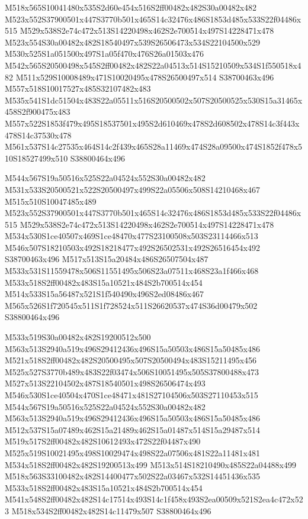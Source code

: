 \documentclass{article}
\begin{document}
\begin{multicols}{2}
M518x565S10041480x535S2d60e454x516S2ff00482x482S30a00482x482 M523x552S37900501x447S3770b501x465S14c32476x486S1853d485x533S22f04486x515 M529x538S2e74c472x513S14220498x462S2e700514x497S14228471x478 M523x554S30a00482x482S18540497x539S26506473x534S22104500x529 M530x525S1a051500x497S1a05f470x476S26a01503x476 M542x565S20500498x545S2ff00482x482S22a04513x514S15210509x534S1f550518x482 M511x529S10008489x471S10020495x478S26500497x514 S38700463x496 M557x518S10017527x485S32107482x483 M535x541S1dc51504x483S22a05511x516S20500502x507S20500525x530S15a31465x458S2f900475x483 M557x522S1853f479x495S18537501x495S2d610469x478S2d608502x478S14c3f443x478S14c37530x478 M561x537S14c27535x464S14c2f439x465S28a11469x474S28a09500x474S1852f478x510S18527499x510 S38800464x496

M544x567S19a50516x525S22a04524x552S30a00482x482 M531x533S20500521x522S20500497x499S22a05506x508S14210468x467 M515x510S10047485x489 M523x552S37900501x447S3770b501x465S14c32476x486S1853d485x533S22f04486x515 M529x538S2e74c472x513S14220498x462S2e700514x497S14228471x478 M534x530S1ce40507x469S1ce48470x477S23100508x503S23114466x513 M546x507S18210503x492S18218477x492S26502531x492S26516454x492 S38700463x496 M517x513S15a20484x486S26507504x487 M533x531S11559478x506S11551495x506S23a07511x468S23a1f466x468 M533x518S2ff00482x483S15a10521x484S2b700514x454 M514x533S15a56487x521S1f540490x496S2ed08486x467 M565x526S1f720545x511S1f728524x511S26620537x474S36d00479x502 S38800464x496

M533x519S30a00482x482S19200512x500 M563x513S2940a519x496S29412436x496S15a50503x486S15a50485x486 M521x518S2ff00482x482S20500495x507S20500494x483S15211495x456 M525x527S3770b489x483S22f03474x506S10051495x505S37800488x473 M527x513S22104502x487S18540501x498S26506474x493 M546x530S1ce40504x470S1ce48471x481S27104506x503S27110453x515 M544x567S19a50516x525S22a04524x552S30a00482x482 M563x513S2940a519x496S29412436x496S15a50503x486S15a50485x486 M512x537S15a07489x462S15a21489x462S15a01487x514S15a29487x514 M519x517S2ff00482x482S10612493x472S22f04487x490 M525x519S10021495x498S10029474x498S22a07506x481S22a11481x481 M534x518S2ff00482x482S19200513x499 M513x514S18210490x485S22a04488x499 M518x563S33100482x482S14400477x502S22a03467x532S14451436x535 M533x518S2ff00482x483S15a10521x484S2b700514x454 M541x548S2ff00482x482S14c17514x493S14c1f458x493S2ea00509x521S2ea4c472x523 M518x534S2ff00482x482S14c11479x507 S38800464x496


\end{multicols}
\end{document}
